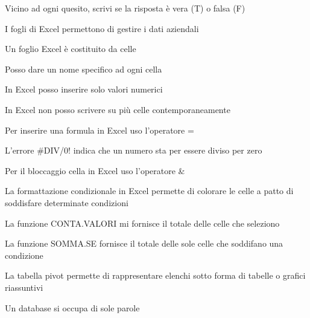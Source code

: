 \documentclass[addpoints]{exam}
\newcommand{\tf}[1][{}]{%
	\fillin[#1][0.25in]%
}
\begin{document}
 
\begin{center}
\end{center}

\vspace{5mm}

 
\vspace{10mm}

Vicino ad ogni quesito, scrivi se la risposta è vera (T) o falsa (F)
\begin{multicols}{2}
	
\begin{questions} 

\question[1] \tf[T] I fogli di Excel permettono di gestire i dati aziendali

\question[1] \tf[T] Un foglio Excel è costituito da celle

\question[1] \tf[T] Posso dare un nome specifico ad ogni cella

\question[1] \tf[F] In Excel posso inserire solo valori numerici

\question[1] \tf[F] In Excel non posso scrivere su più celle contemporaneamente

\question[1] \tf[T] Per inserire una formula in Excel uso l'operatore =

\question[1] \tf[T] L'errore \#DIV/0! indica che un numero sta per essere diviso per zero

\question[1] \tf[F] Per il bloccaggio cella in Excel uso l'operatore \&

\question[1] \tf[T] La formattazione condizionale in Excel permette di colorare le celle a patto di soddisfare determinate condizioni

\question[1] \tf[F] La funzione CONTA.VALORI mi fornisce il totale delle celle che seleziono

\question[1] \tf[T] La funzione SOMMA.SE fornisce il totale delle sole celle che soddifano una condizione

\question[1] \tf[T] La tabella pivot permette di rappresentare elenchi sotto forma di tabelle o grafici riassuntivi

\question[1] \tf[F] Un database si occupa di sole parole


\end{questions}
\end{multicols}
\end{document}
